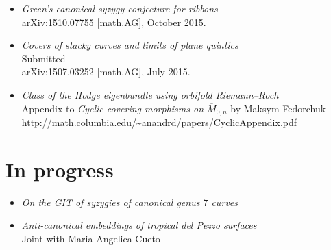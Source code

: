 \documentclass[12pt]{amsart}
\begin{document}
\begin{itemize}
    \setlength{\itemsep}{.5em}

\item
  {\em Green's canonical syzygy conjecture for ribbons}\\
  {arXiv:1510.07755 [math.AG]}, October 2015.
  
\item
  {\em Covers of stacky curves and limits of plane quintics}\\
  Submitted\\
  {arXiv:1507.03252 [math.AG]}, July 2015.

\item
  {\em Class of the Hodge eigenbundle using orbifold Riemann--Roch}\\
  {Appendix to {\em Cyclic covering morphisms on $\overline {M}_{0,n}$} by Maksym Fedorchuk}\\
  \href{http://math.columbia.edu/~anandrd/papers/CyclicAppendix.pdf}{http://math.columbia.edu/\textasciitilde anandrd/papers/CyclicAppendix.pdf}

\end{itemize}

\section{In progress}
\begin{itemize}
    \setlength{\itemsep}{.5em}

  \item
   {\em On the {GIT} of syzygies of canonical genus $7$ curves}\\

\item
  {\em Anti-canonical embeddings of tropical del Pezzo surfaces}\\
  Joint with Maria Angelica Cueto

\end{itemize}



% 
% 
\end{document}
